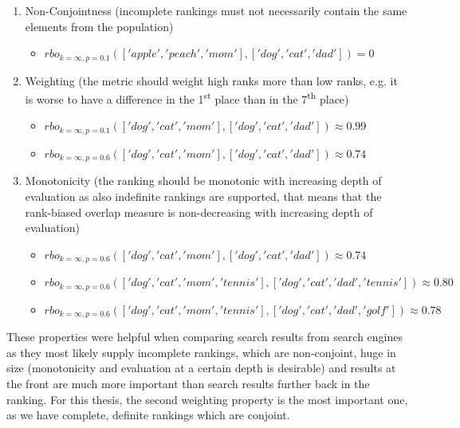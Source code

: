 \documentclass[draft,final]{thesisclass} %
\begin{document}
\begin{enumerate}
\item Non-Conjointness (incomplete rankings must not necessarily contain the same elements from the population)
\begin{itemize}
    \item $rbo_{k=\infty,p=0.1}(['apple','peach','mom'],['dog','cat','dad']) = 0$
\end{itemize}
\item Weighting (the metric should weight high ranks more than low ranks, e.g. it is worse to have a difference in the 1\textsuperscript{st} place than in the 7\textsuperscript{th} place)
\begin{itemize}
    \item $rbo_{k=\infty,p=0.1}(['dog','cat','mom'],['dog','cat','dad']) \approx 0.99$
    \item $rbo_{k=\infty,p=0.6}(['dog','cat','mom'],['dog','cat','dad']) \approx 0.74$
\end{itemize}
\item Monotonicity (the ranking should be monotonic with increasing depth of evaluation as also indefinite rankings are supported, that means that the rank-biased overlap measure is non-decreasing with increasing depth of evaluation)
\begin{itemize}
    \item $rbo_{k=\infty,p=0.6}(['dog','cat','mom'],['dog','cat','dad']) \approx 0.74$
    \item $rbo_{k=\infty,p=0.6}(['dog','cat','mom','tennis'],['dog','cat','dad','tennis']) \approx 0.80$
    \item $rbo_{k=\infty,p=0.6}(['dog','cat','mom','tennis'],['dog','cat','dad','golf']) \approx 0.78$
\end{itemize}
\end{enumerate}
These properties were helpful when comparing search results from search engines as they most likely supply incomplete rankings, which are non-conjoint, huge in size (monotonicity and evaluation at a certain depth is desirable) and results at the front are much more important than search results further back in the ranking.
For this thesis, the second weighting property is the most important one, as we have complete, definite rankings which are conjoint.
\end{document}
